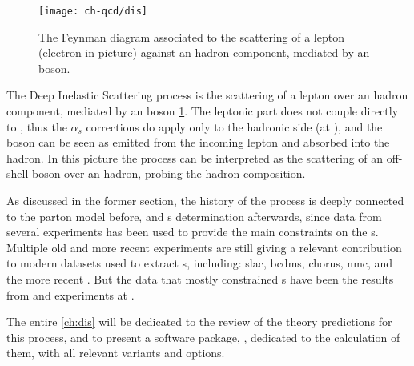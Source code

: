 
\begin{figure}
	\centering
	\texttt{[image: ch-qcd/dis]}
	\caption{
		The \lo Feynman diagram associated to the scattering of a lepton (electron
		in picture) against an hadron component, mediated by an \ew boson.\footnotemark
	}
	\label{fig:qcd/dis}
\end{figure}


The Deep Inelastic Scattering process is the scattering of a lepton over an
hadron component, mediated by an \ew boson \cref{fig:qcd/dis}.
%
The leptonic part does not couple directly to \qcd , thus the $\alpha_s$
corrections do apply only to the hadronic side (at \lo \ew), and the \ew boson
can be seen as emitted from the incoming lepton and absorbed into the hadron.
%
In this picture the process can be interpreted as the scattering of an
off-shell \ew boson over an hadron, probing the hadron composition.

As discussed in the former section, the history of the \dis process is deeply
connected to the parton model before, and \pdf{}s determination afterwards,
since data from several \dis experiments has been used to provide the main
constraints on the \pdf{}s.
%
Multiple old and more recent \dis experiments are still giving a relevant
contribution to modern datasets used to extract \pdf{}s, including:
\acrfull{slac}, \acrfull{bcdms}, \acrfull{chorus}, \acrfull{nmc}, and the more
recent \nutev.
%
But the \dis data that mostly constrained \pdf{}s have been the results from
\hone and \zeus experiments at \hera.

The entire \cref{ch:dis} will be dedicated to the review of the theory
predictions for this process, and to present a software package, \yadism,
dedicated to the calculation of them, with all relevant variants and options.
